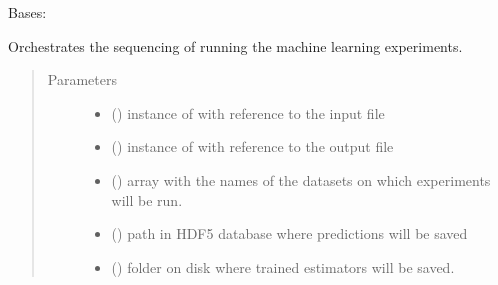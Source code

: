 \documentclass[letterpaper,10pt,english]{sphinxmanual}
\begin{document}
\begin{fulllineitems}
\label{\detokenize{experiments:mleap.experiments.orchestrator.Orchestrator}}
Bases: 

Orchestrates the sequencing of running the machine learning experiments.
\begin{quote}\begin{description}
\item[{Parameters}] \leavevmode\begin{itemize}
\item {} 
 ({\hyperref[\detokenize{shared:mleap.shared.files_io.FilesIO}]{}}) \textendash{} instance of {\hyperref[\detokenize{shared:mleap.shared.files_io.FilesIO}]{}} with reference to the input file

\item {} 
 ({\hyperref[\detokenize{shared:mleap.shared.files_io.FilesIO}]{}}) \textendash{} instance of {\hyperref[\detokenize{shared:mleap.shared.files_io.FilesIO}]{}} with reference to the output file

\item {} 
 () \textendash{} array with the names of the datasets on which experiments will be run.

\item {} 
 () \textendash{} path in HDF5 database where predictions will be saved

\item {} 
 () \textendash{} folder on disk where trained estimators will be saved.

\end{itemize}

\end{description}\end{quote}


\end{fulllineitems}
\end{document}
